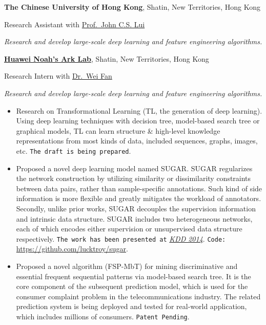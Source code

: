 \documentclass[10pt,a4paper]{article}
\renewenvironment{description}{
  \begin{basedescript}{\desclabelstyle{\pushlabel}\desclabelwidth{8em}}
}{
  \end{basedescript}
}
\begin{document}
\begin{description}
\item[05/2013 - present]
\textbf{The Chinese University of Hong Kong}, Shatin, New Territories,
Hong Kong

Research Assistant with \href{http://www.cs.cuhk.hk/~cslui/}{Prof.~John
C.S. Lui}

\emph{Research and develop large-scale deep learning and feature
engineering algorithms.}
\item[05/2013 - present]
\href{http://www.noahlab.com.hk/}{\textbf{Huawei Noah's Ark Lab}},
Shatin, New Territories, Hong Kong

Research Intern with \href{http://www.weifan.info/}{Dr.~Wei Fan}

\emph{Research and develop large-scale deep learning and feature
engineering algorithms.}

\begin{itemize}
\itemsep1pt\parskip0pt
\item
  \small Research on Transformational Learning (TL, the generation of
  deep learning). Using deep learning techniques with decision tree,
  model-based search tree or graphical models, TL can learn structure \&
  high-level knowledge representations from most kinds of data, included
  sequences, graphs, images, etc. \texttt{The draft is being prepared}.
\end{itemize}

\begin{itemize}
\itemsep1pt\parskip0pt
\item
  \small Proposed a novel deep learning model named SUGAR. SUGAR
  regularizes the network construction by utilizing similarity or
  dissimilarity constraints between data pairs, rather than
  sample-specific annotations. Such kind of side information is more
  flexible and greatly mitigates the workload of annotators. Secondly,
  unlike prior works, SUGAR decouples the supervision information and
  intrinsic data structure. SUGAR includes two heterogeneous networks,
  each of which encodes either supervision or unsupervised data
  structure respectively. \texttt{The work has been presented at}
  \href{http://www.kdd.org/kdd2014/}{\emph{KDD 2014}}. \texttt{Code:}
  \url{https://github.com/lucktroy/sugar}.
\end{itemize}

\begin{itemize}
\itemsep1pt\parskip0pt
\item
  \small Proposed a novel algorithm (FSP-MbT) for mining discriminative
  and essential frequent sequential patterns via model-based search
  tree. It is the core component of the subsequent prediction model,
  which is used for the consumer complaint problem in the
  telecommunications industry. The related prediction system is being
  deployed and tested for real-world application, which includes
  millions of consumers. \texttt{Patent Pending}.
\end{itemize}


\end{description}
\end{document}

